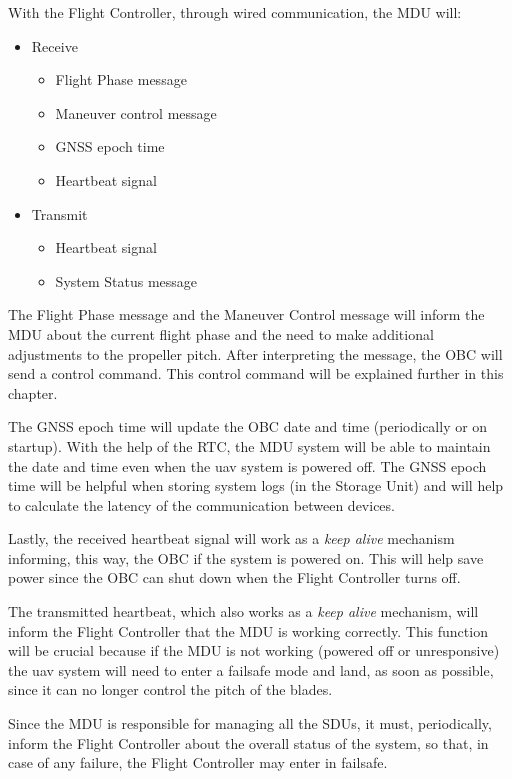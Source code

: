 With the Flight Controller, through wired communication, the MDU will:
\begin{itemize}
    \item Receive
          \begin{itemize}
              \item Flight Phase message
              \item Maneuver control message
              \item \gls{GNSS} epoch time
              \item Heartbeat signal
          \end{itemize}
    \item Transmit
          \begin{itemize}
              \item Heartbeat signal
              \item System Status message
          \end{itemize}
\end{itemize}

The Flight Phase message and the Maneuver Control message will inform the MDU about the current flight phase and the need to make additional adjustments to the propeller pitch.
After interpreting the message, the \gls{OBC} will send a control command.
This control command will be explained further in this chapter.

The \gls{GNSS} epoch time will update the \gls{OBC} date and time (periodically or on startup).
With the help of the \gls{RTC}, the MDU system will be able to maintain the date and time even when the \gls{uav} system is powered off.
The \gls{GNSS} epoch time will be helpful when storing system logs (in the Storage Unit) and will help to calculate the latency of the communication between devices.

Lastly, the received heartbeat signal will work as a \textit{keep alive} mechanism informing, this way, the \gls{OBC} if the system is powered on.
This will help save power since the \gls{OBC} can shut down when the Flight Controller turns off.

The transmitted heartbeat, which also works as a \textit{keep alive} mechanism, will inform the Flight Controller that the MDU is working correctly.
This function will be crucial because if the MDU is not working (powered off or unresponsive) the \gls{uav} system will need to enter a failsafe mode and land, as soon as possible, since it can no longer control the pitch of the blades.

Since the MDU is responsible for managing all the SDUs, it must, periodically, inform the Flight Controller about the overall status of the system, so that, in case of any failure, the Flight Controller may enter in failsafe.

